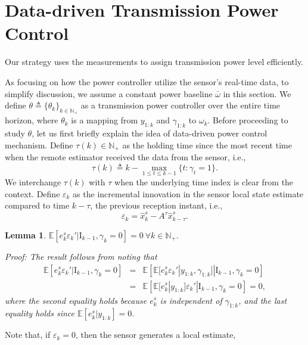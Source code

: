 \documentclass[twocolumn]{autart}    \usepackage{cite}
\newtheorem{lemma}[theorem]{Lemma}
\begin{document}
{\section{Data-driven Transmission Power Control}\label{sec:transmission-power-control}
Our strategy uses
the measurements  to assign
transmission power level efficiently.
{As focusing on how the power controller utilize the
sensor's real-time data,
to simplify discussion, we assume a constant power
baseline $\bar \omega$ in this section.
We define
$\theta\triangleq \{\theta_k\}_{k\in\mathbb{N}_+}$
as a transmission power controller over the entire time horizon, where
$\theta_k$ is a mapping from $y_{1:k}$ and $\gamma_{1:k}$ to $\omega_k$.
Before proceeding to study $\theta$, let us first briefly explain the idea of data-driven power control mechanism.
Define $\tau(k)\in\mathbb N_+$ as the holding time since
the most recent time when the remote estimator received the data from the sensor, i.e.,
\begin{equation} \label{definiton_tau}
  \tau(k)\triangleq k-\max_{1\leqslant t \leqslant k-1}\{t : \gamma_t=1\}.
\end{equation}
We interchange $\tau(k)$ with $\tau$ when the underlying time index is clear from the context.
Define $\varepsilon_k$ as the incremental innovation in the sensor local state estimate compared to time $k-\tau$, the previous reception instant, i.e.,
\begin{equation} \label{definition:z_k}
\varepsilon_k=\hat x_k^s-A^\tau\hat x_{k-\tau}^s.
\end{equation}
\begin{lemma} \label{lemma:z_k}
$\mathbb{E} [e_k^s\varepsilon_{k}'|\mathrm{I}_{k-1},\gamma_k=0]=0~\forall k\in \mathbb{N}_+.$
\begin{pf*}{Proof:}
{
The result follows from noting that
\begin{eqnarray*}
\mathbb{E} [e_k^s\varepsilon_{k}'|\mathrm{I}_{k-1},\gamma_k=0]
&=&\mathbb{E} \left[\mathbb{E} [e_k^s\varepsilon_{k}'|y_{1:k},\gamma_{1:k}]|\mathrm{I}_{k-1},
\gamma_k=0\right]\\
&=&\mathbb{E} \left[\mathbb{E} [e_k^s|y_{1:k}]\varepsilon_{k}'|\mathrm{I}_{k-1},
\gamma_k=0\right]=0,
\end{eqnarray*}
where the second equality holds because $e_k^s$ is independent of $\gamma_{1:k}$, and
the last equality holds since $\mathbb{E} [e_k^s|y_{1:k}]=0.$
}
\end{pf*}
\end{lemma}
Note that, if $\varepsilon_k=0$, then the sensor generates a local estimate,
}}
\end{document}
